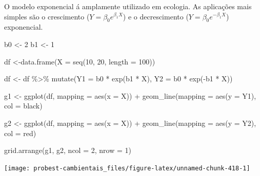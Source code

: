 \documentclass[
]{book}
\newenvironment{Shaded}{\begin{snugshade}}{\end{snugshade}}
\newcommand{\AttributeTok}[1]{\textcolor[rgb]{0.77,0.63,0.00}{#1}}
\newcommand{\DecValTok}[1]{\textcolor[rgb]{0.00,0.00,0.81}{#1}}
\newcommand{\FunctionTok}[1]{\textcolor[rgb]{0.00,0.00,0.00}{#1}}
\newcommand{\NormalTok}[1]{#1}
\newcommand{\OtherTok}[1]{\textcolor[rgb]{0.56,0.35,0.01}{#1}}
\newcommand{\SpecialCharTok}[1]{\textcolor[rgb]{0.00,0.00,0.00}{#1}}
\newcommand{\StringTok}[1]{\textcolor[rgb]{0.31,0.60,0.02}{#1}}
\begin{document}
O modelo exponencial á amplamente utilizado em ecologia. As aplicações mais simples são o crescimento (\(Y = \beta_0 e^{\beta_1 X}\)) e o decrescimento (\(Y = \beta_0 e^{-\beta_1 X}\)) exponencial.

\begin{Shaded}
\begin{Highlighting}[]
\NormalTok{b0 }\OtherTok{\textless{}{-}} \DecValTok{2}
\NormalTok{b1 }\OtherTok{\textless{}{-}} \DecValTok{1}

\NormalTok{df }\OtherTok{\textless{}{-}}\FunctionTok{data.frame}\NormalTok{(}\AttributeTok{X =} \FunctionTok{seq}\NormalTok{(}\DecValTok{10}\NormalTok{, }\DecValTok{20}\NormalTok{, }\AttributeTok{length =} \DecValTok{100}\NormalTok{))}

\NormalTok{df }\OtherTok{\textless{}{-}}\NormalTok{ df }\SpecialCharTok{\%\textgreater{}\%} \FunctionTok{mutate}\NormalTok{(}\AttributeTok{Y1 =}\NormalTok{ b0 }\SpecialCharTok{*} \FunctionTok{exp}\NormalTok{(b1 }\SpecialCharTok{*}\NormalTok{ X),}
                    \AttributeTok{Y2 =}\NormalTok{ b0 }\SpecialCharTok{*} \FunctionTok{exp}\NormalTok{(}\SpecialCharTok{{-}}\NormalTok{b1 }\SpecialCharTok{*}\NormalTok{ X))}

\NormalTok{g1 }\OtherTok{\textless{}{-}} \FunctionTok{ggplot}\NormalTok{(df, }\AttributeTok{mapping =} \FunctionTok{aes}\NormalTok{(}\AttributeTok{x =}\NormalTok{ X)) }\SpecialCharTok{+}
  \FunctionTok{geom\_line}\NormalTok{(}\AttributeTok{mapping =} \FunctionTok{aes}\NormalTok{(}\AttributeTok{y =}\NormalTok{ Y1), }\AttributeTok{col =} \StringTok{\textquotesingle{}black\textquotesingle{}}\NormalTok{)}

\NormalTok{g2 }\OtherTok{\textless{}{-}} \FunctionTok{ggplot}\NormalTok{(df, }\AttributeTok{mapping =} \FunctionTok{aes}\NormalTok{(}\AttributeTok{x =}\NormalTok{ X)) }\SpecialCharTok{+}
  \FunctionTok{geom\_line}\NormalTok{(}\AttributeTok{mapping =} \FunctionTok{aes}\NormalTok{(}\AttributeTok{y =}\NormalTok{ Y2), }\AttributeTok{col =} \StringTok{\textquotesingle{}red\textquotesingle{}}\NormalTok{)}

\FunctionTok{grid.arrange}\NormalTok{(g1, g2, }\AttributeTok{ncol =} \DecValTok{2}\NormalTok{, }\AttributeTok{nrow =} \DecValTok{1}\NormalTok{)}
\end{Highlighting}
\end{Shaded}

\begin{center}\texttt{[image: probest-cambientais\_files/figure-latex/unnamed-chunk-418-1]} \end{center}
\end{document}
